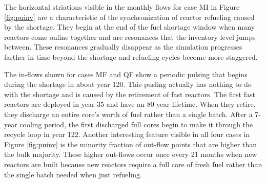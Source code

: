 \documentclass{style}
\begin{document}
The horizontal striations visible in the monthly flows for case MI in Figure
\ref{fig:puinv} are a characteristic of the synchronization of reactor
refueling caused by the shortage.  They begin at the end of the fuel shortage
window when many reactors come online together and are resonances that the
inventory level jumps between.  These resonances gradually disappear as the
simulation progresses farther in time beyond the shortage and refueling cycles
become more staggered.

The in-flows shown for cases MF and QF show a periodic pulsing that begins
during the shortage in about year 120.  This pusling actually has nothing to
do with the shortage and is caused by the retirement of fast reactors.  The
first fast reactors are deployed in year 35 and have an 80 year lifetime.
When they retire, they discharge an entire core's worth of fuel rather than a
single batch.  After a 7-year cooling period, the first discharged full cores
begin to make it through the recycle loop in year 122.  Another interesting
feature visible in all four cases in Figure \ref{fig:puinv} is the minority
fraction of out-flow points that are higher than the bulk majority. These
higher out-flows occur once every 21 months when new reactors are built because
new reactors require a full core of fresh fuel rather than the single batch
needed when just refueling.  
\end{document}
